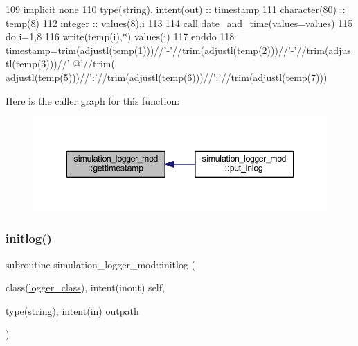 \begin{DoxyCode}
109     \textcolor{keywordtype}{implicit none}
110     \textcolor{keywordtype}{type}(string), \textcolor{keywordtype}{intent(out)} :: timestamp
111     \textcolor{keywordtype}{character(80)} :: temp(8)
112     \textcolor{keywordtype}{integer} :: values(8),i
113 
114     \textcolor{keyword}{call }date\_and\_time(values=values)
115     \textcolor{keywordflow}{do} i=1,8
116         \textcolor{keyword}{write}(temp(i),*) values(i)
117 \textcolor{keywordflow}{    enddo}
118     timestamp=trim(adjustl(temp(1)))//\textcolor{stringliteral}{'-'}//trim(adjustl(temp(2)))//\textcolor{stringliteral}{'-'}//trim(adjustl(temp(3)))//\textcolor{stringliteral}{' @'}//trim(
      adjustl(temp(5)))//\textcolor{stringliteral}{':'}//trim(adjustl(temp(6)))//\textcolor{stringliteral}{':'}//trim(adjustl(temp(7)))
\end{DoxyCode}
Here is the caller graph for this function\+:\nopagebreak
\begin{figure}[H]
\begin{center}
\leavevmode
\includegraphics[width=348pt]{namespacesimulation__logger__mod_a0326a5eeb649b041064a01d96aef0989_icgraph}
\end{center}
\end{figure}
\mbox{\label{namespacesimulation__logger__mod_abf603e657da9104a8060ab53c72f0aca}} 
\subsubsection{\texorpdfstring{initlog()}{initlog()}}
{\footnotesize\ttfamily subroutine simulation\+\_\+logger\+\_\+mod\+::initlog (\begin{DoxyParamCaption}\item[{class(\mbox{\hyperlink{structsimulation__logger__mod_1_1logger__class}{logger\+\_\+class}}), intent(inout)}]{self,  }\item[{type(string), intent(in)}]{outpath }\end{DoxyParamCaption})\hspace{0.3cm}{\ttfamily [private]}}



